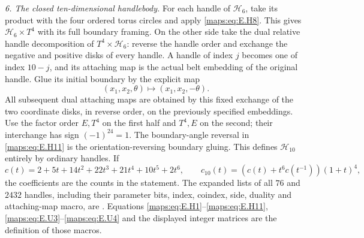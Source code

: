 \begin{theorem}
\emph{6. The closed ten-dimensional handlebody.}
For each handle of $\mathcal H_6$, take its product with the four
ordered torus circles and apply \eqref{maps:eq:E.H8}.  This gives
$\mathcal H_6\times T^4$ with its full boundary framing.  On the
other side take the dual relative handle decomposition of
$T^4\times\mathcal H_6$: reverse the handle order and exchange
the negative and positive disks of every handle.  A handle of
index $j$ becomes one of index $10-j$, and its attaching map is
the actual belt embedding of the original handle.  Glue its
initial boundary by the explicit map
\[
                 (x_1,x_2,\theta)\longmapsto
                                    (x_1,x_2,-\theta).
 \tag{E.H11}\label{maps:eq:E.H11}
\]
All subsequent dual attaching maps are obtained by this fixed
exchange of the two coordinate disks, in reverse order, on the
previously specified embeddings.  Use the factor order $E,T^4$
on the first half and $T^4,E$ on the second; their interchange
has sign $(-1)^{24}=1$.  The boundary-angle reversal in \eqref{maps:eq:E.H11}
is the orientation-reversing boundary gluing.  This defines
$\mathcal H_{10}$ entirely by ordinary handles.  If
\[
 c(t)=2+5t+14t^2+22t^3+21t^4+10t^5+2t^6,
 \qquad
       c_{10}(t)=(c(t)+t^6c(t^{-1}))(1+t)^4,
 \tag{E.H12}\label{maps:eq:E.H12}
\]
the coefficients are the counts in the statement.  The expanded
lists of all $76$ and $2432$ handles, including their parameter
bits, index, coindex, side, duality and attaching-map macro, are
.  Equations
\eqref{maps:eq:E.H1}--\eqref{maps:eq:E.H11}, \eqref{maps:eq:E.U3}--\eqref{maps:eq:E.U4} and the displayed integer matrices
are the definition of those macros.

\end{theorem}


